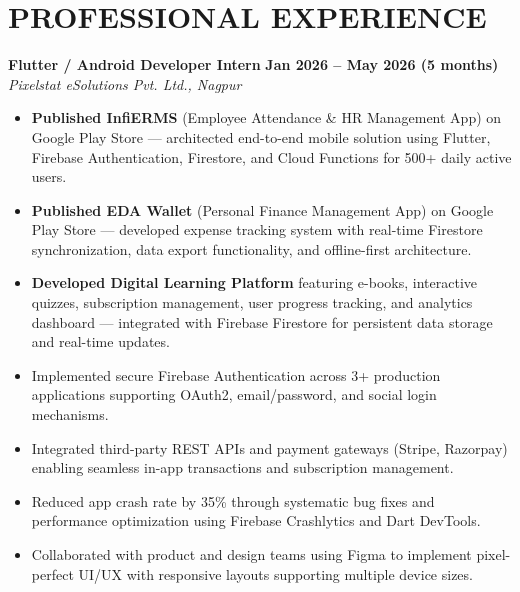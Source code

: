 \documentclass[a4paper,11pt]{article}
\begin{document}
\section{PROFESSIONAL EXPERIENCE}

\noindent\textbf{Flutter / Android Developer Intern} \hfill \textbf{Jan 2026 -- May 2026 (5 months)}\\
\textit{Pixelstat eSolutions Pvt. Ltd., Nagpur}
\begin{itemize}[leftmargin=*,noitemsep,topsep=2pt,itemsep=3pt]
    \item \textbf{Published InfiERMS} (Employee Attendance \& HR Management App) on Google Play Store — architected end-to-end mobile solution using Flutter, Firebase Authentication, Firestore, and Cloud Functions for 500+ daily active users.
    \item \textbf{Published EDA Wallet} (Personal Finance Management App) on Google Play Store — developed expense tracking system with real-time Firestore synchronization, data export functionality, and offline-first architecture.
    \item \textbf{Developed Digital Learning Platform} featuring e-books, interactive quizzes, subscription management, user progress tracking, and analytics dashboard — integrated with Firebase Firestore for persistent data storage and real-time updates.
    \item Implemented secure Firebase Authentication across 3+ production applications supporting OAuth2, email/password, and social login mechanisms.
    \item Integrated third-party REST APIs and payment gateways (Stripe, Razorpay) enabling seamless in-app transactions and subscription management.
    \item Reduced app crash rate by 35\% through systematic bug fixes and performance optimization using Firebase Crashlytics and Dart DevTools.
    \item Collaborated with product and design teams using Figma to implement pixel-perfect UI/UX with responsive layouts supporting multiple device sizes.
\end{itemize}
\vspace{2mm}
\end{document}
